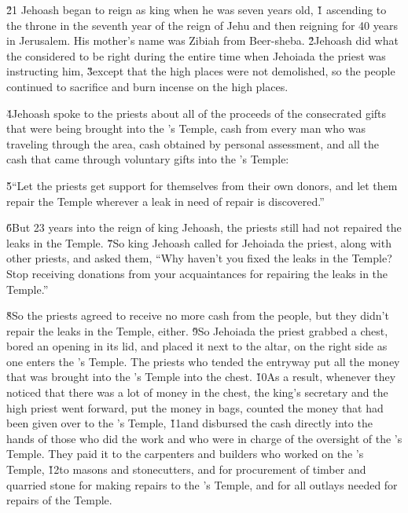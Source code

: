 \v{21} Jehoash began to reign as king when he was seven years old,
\v{1} ascending to the throne in the seventh year of the reign of Jehu and then reigning for 40 years in Jerusalem. His mother's name was Zibiah from Beer-sheba. \v{2}Jehoash did what the  considered to be right during the entire time when Jehoiada the priest was instructing him, \v{3}except that the high places were not demolished, so the people continued to sacrifice and burn incense on the high places.

\v{4}Jehoash spoke to the priests about all of the proceeds of the consecrated gifts that were being brought into the 's Temple, cash from every man who was traveling through the area, cash obtained by personal assessment, and all the cash that came through voluntary gifts into the 's Temple:

\begin{poetry}
\poeml \v{5}``Let the priests get support for themselves from their own donors, and let them repair the Temple wherever a leak in need of repair is discovered.''
\end{poetry}

\v{6}But 23 years into the reign of king Jehoash, the priests still had not repaired the leaks in the Temple. \v{7}So king Jehoash called for Jehoiada the priest, along with other priests, and asked them, ``Why haven't you fixed the leaks in the Temple? Stop receiving donations from your acquaintances for repairing the leaks in the Temple.''

\v{8}So the priests agreed to receive no more cash from the people, but they didn't repair the leaks in the Temple, either. \v{9}So Jehoiada the priest grabbed a chest, bored an opening in its lid, and placed it next to the altar, on the right side as one enters the 's Temple. The priests who tended the entryway put all the money that was brought into the 's Temple into the chest. \v{10}As a result, whenever they noticed that there was a lot of money in the chest, the king's secretary and the high priest went forward, put the money in bags, counted the money that had been given over to the 's Temple, \v{11}and disbursed the cash directly into the hands of those who did the work and who were in charge of the oversight of the 's Temple. They paid it to the carpenters and builders who worked on the 's Temple, \v{12}to masons and stonecutters, and for procurement of timber and quarried stone for making repairs to the 's Temple, and for all outlays needed for repairs of the Temple.

